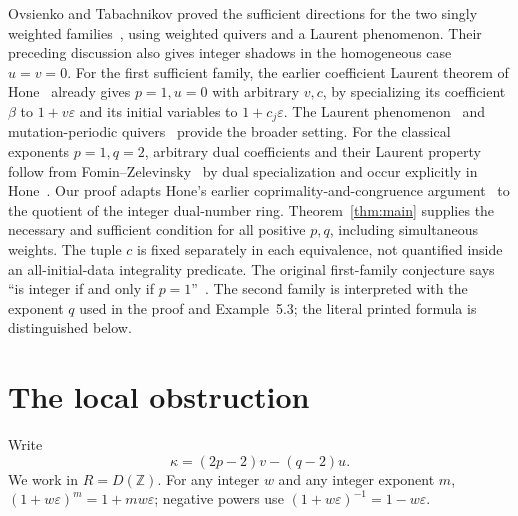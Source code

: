 \documentclass[11pt]{article}
\newcommand{\ZZ}{\mathbb Z}
\newcommand{\eps}{\varepsilon}
\begin{document}
Ovsienko and Tabachnikov proved the sufficient directions for the
two singly weighted families~\cite[Corollary~5.2]{OT}, using weighted
quivers and a Laurent phenomenon. Their preceding discussion also
gives integer shadows in the homogeneous case $u=v=0$.
For the first sufficient family, the earlier coefficient Laurent theorem
of Hone~\cite[Section~3, Proposition~1]{Hone07} already gives $p=1,u=0$
with arbitrary $v,c$, by specializing its coefficient $\beta$ to
$1+v\eps$ and its initial variables to $1+c_j\eps$.
The Laurent phenomenon~\cite{FZ} and mutation-periodic
quivers~\cite{FM} provide the broader setting. For the classical
exponents $p=1,q=2$, arbitrary dual coefficients and their Laurent
property follow from Fomin--Zelevinsky~\cite[Theorem~1.8]{FZ} by dual
specialization and occur explicitly in Hone~\cite[Section~1, Lemma~1.1]{Hone}.
Our proof adapts Hone's earlier coprimality-and-congruence
argument~\cite{Hone07} to the quotient of the integer dual-number ring.
Theorem~\ref{thm:main} supplies the necessary and sufficient condition
for all positive $p,q$, including simultaneous weights.
The tuple $c$ is fixed separately in each equivalence, not quantified
inside an all-initial-data integrality predicate.
The original first-family conjecture says ``is integer if and only if
$p=1$''~\cite[p.~11]{OT}. The second family is interpreted with the
exponent $q$ used in the proof and Example~5.3; the literal printed
formula is distinguished below.

\section{The local obstruction}
Write
\begin{equation}\label{eq:kappa}
 \kappa=(2p-2)v-(q-2)u.
\end{equation}
We work in $R=D(\ZZ)$. For any integer $w$ and any integer exponent $m$,
$(1+w\eps)^m=1+mw\eps$; negative powers use
$(1+w\eps)^{-1}=1-w\eps$.
\end{document}

